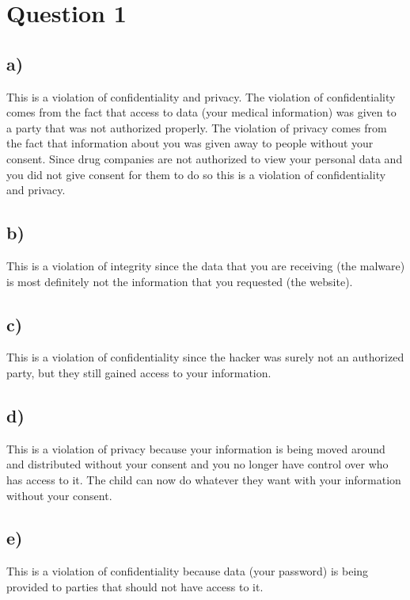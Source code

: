 \documentclass{article}
\begin{document}
\section*{Question 1} %
\label{sec:question_1}


\subsection*{a)} %
\label{sub:a_}
This is a violation of confidentiality and privacy. The violation of confidentiality comes from the fact that access to data (your medical information) was given to a party that was not authorized properly. The violation of privacy comes from the fact that information about you was given away to people without your consent. Since drug companies are not authorized to view your personal data and you did not give consent for them to do so this is a violation of confidentiality and privacy.

\subsection*{b)} %
\label{sub:b_}
This is a violation of integrity since the data that you are receiving (the malware) is most definitely not the information that you requested (the website).

\subsection*{c)} %
\label{sub:c_}
This is a violation of confidentiality since the hacker was surely not an authorized party, but they still gained access to your information.

\subsection*{d)} %
\label{sub:d_}
This is a violation of privacy because your information is being moved around and distributed without your consent and you no longer have control over who has access to it. The child can now do whatever they want with your information without your consent.

\subsection*{e)} %
\label{sub:e_}
This is a violation of confidentiality because data (your password) is being provided to parties that should not have access to it.
\end{document}

